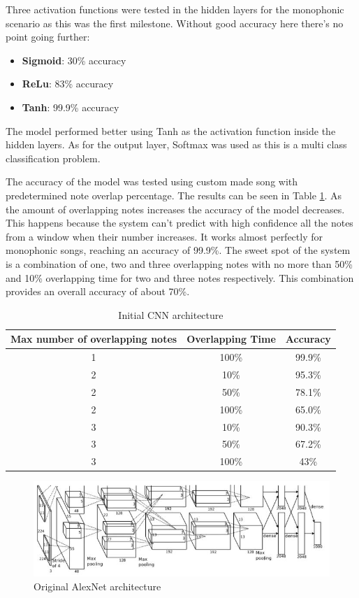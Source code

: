 Three activation functions were tested in the hidden layers for the monophonic scenario as this was the first milestone. Without good accuracy here there's no point going further:
\begin{itemize}
	\item \textbf{Sigmoid}: 30\% accuracy
	\item \textbf{ReLu}: 83\% accuracy
	\item \textbf{Tanh}: 99.9\% accuracy
\end{itemize}

The model performed better using Tanh as the activation function inside the hidden layers. As for the output layer, Softmax was used as this is a multi class classification problem.

\par
The accuracy of the model was tested using custom made song with predetermined note overlap percentage. 
The results can be seen in Table \ref{table:results}. As the amount of overlapping notes increases the accuracy of the model decreases. This happens because the system can't predict with high confidence all the notes from a window when their number increases. It works almost perfectly for monophonic songs, reaching an accuracy of 99.9\%. The sweet spot of the system is a combination of one, two and three overlapping notes with no more than 50\% and 10\% overlapping time for two and three notes respectively. This combination provides an overall accuracy of about 70\%.

\begin{table} [H]
	\centering
	\caption{Initial CNN architecture}
	\begin{tabular}{ |c|c|c|} 
		\hline
		Max number of overlapping notes & Overlapping Time & Accuracy\\ \hline
		1 & 100\% & 99.9\%  \\ \hline
		2 & 10\% & 95.3\% \\ \hline
		2 & 50\% & 78.1\% \\ \hline
		2 & 100\% & 65.0\% \\ \hline
		3 & 10\% & 90.3\% \\ \hline
		3 & 50\% & 67.2\% \\ \hline
		3 & 100\% & 43\% \\ \hline				
	\end{tabular}
	\label{table:results}
\end{table}

\begin{figure}[H]
	\caption[AlexNet Architecture]{ Original AlexNet architecture~\cite{alexnet}}
	\centering
	\label{fig:alexnet}
	\includegraphics[width=1\textwidth, height=\textheight, keepaspectratio]{"resources/alexnet"}
\end{figure}

